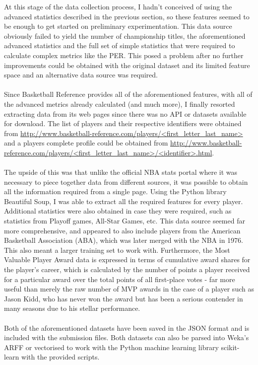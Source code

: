 \documentclass[paper=a4, fontsize=11pt]{scrartcl} %
\numberwithin{equation}{section} %
\numberwithin{figure}{section} %
\numberwithin{table}{section} %
\begin{document}
At this stage of the data collection process, I hadn't conceived of using the advanced statistics described in the previous section, so these features seemed to be enough to get started on preliminary experimentation. This data source obviously failed to yield the number of championship titles, the aforementioned advanced statistics and the full set of simple statistics that were required to calculate complex metrics like the PER. This posed a problem after no further improvements could be obtained with the original dataset and its limited feature space and an alternative data source was required.\\
\\
Since Basketball Reference provides all of the aforementioned features, with all of the advanced metrics already calculated (and much more), I finally resorted extracting data from its web pages since there was no API or datasets available for download. The list of players and their respective identifiers were obtained from \url{http://www.basketball-reference.com/players/<first_letter_last_name>} and a players complete profile could be obtained from \url{http://www.basketball-reference.com/players/<first_letter_last_name>/<identifier>.html}. \\
\\
The upside of this was that unlike the official NBA stats portal where it was necessary to piece together data from different sources, it was possible to obtain all the information required from a single page. Using the Python library Beautiful Soup, I was able to extract all the required features for every player. Additional statistics were also obtained in case they were required, such as statistics from Playoff games, All-Star Games, etc. This data source seemed far more comprehensive, and appeared to also include players from the American Basketball Association (ABA), which was later merged with the NBA in 1976. This also meant a larger training set to work with. Furthermore, the Most Valuable Player Award data is expressed in terms of cumulative award shares for the player's career, which is calculated by the number of points a player received for a particular award over the total points of all first-place votes\cite{mvp} - far more useful than merely the raw number of MVP awards in the case of a player such as Jason Kidd, who has never won the award but has been a serious contender in many seasons due to his stellar performance.\\
\\
Both of the aforementioned datasets have been saved in the JSON format and is included with the submission files. Both datasets can also be parsed into Weka's ARFF or vectorised to work with the Python machine learning library scikit-learn with the provided scripts.
\end{document}
